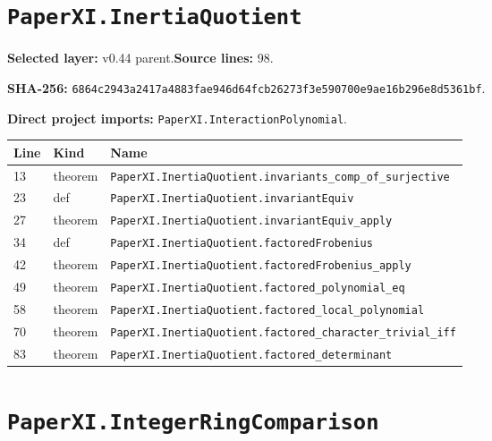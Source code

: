\documentclass[10pt,oneside]{book}
\begin{document}
\section{\texorpdfstring{\nolinkurl{PaperXI.InertiaQuotient}}{PaperXI.InertiaQuotient}}\label{module:PaperXI.InertiaQuotient}

\textbf{Selected layer:} v0.44 parent.\quad\textbf{Source lines:} 98.\par\textbf{SHA-256:} {\scriptsize\nolinkurl{6864c2943a2417a4883fae946d64fcb26273f3e590700e9ae16b296e8d5361bf}}.


\textbf{Direct project imports:} \nolinkurl{PaperXI.InteractionPolynomial}.

\begin{longtable}{@{}p{}p{}p{}@{}}\toprule Line&Kind&Name\\\midrule\endhead

13&theorem&\nolinkurl{PaperXI.InertiaQuotient.invariants_comp_of_surjective}\\

23&def&\nolinkurl{PaperXI.InertiaQuotient.invariantEquiv}\\

27&theorem&\nolinkurl{PaperXI.InertiaQuotient.invariantEquiv_apply}\\

34&def&\nolinkurl{PaperXI.InertiaQuotient.factoredFrobenius}\\

42&theorem&\nolinkurl{PaperXI.InertiaQuotient.factoredFrobenius_apply}\\

49&theorem&\nolinkurl{PaperXI.InertiaQuotient.factored_polynomial_eq}\\

58&theorem&\nolinkurl{PaperXI.InertiaQuotient.factored_local_polynomial}\\

70&theorem&\nolinkurl{PaperXI.InertiaQuotient.factored_character_trivial_iff}\\

83&theorem&\nolinkurl{PaperXI.InertiaQuotient.factored_determinant}\\

\bottomrule\end{longtable}

\section{\texorpdfstring{\nolinkurl{PaperXI.IntegerRingComparison}}{PaperXI.IntegerRingComparison}}\label{module:PaperXI.IntegerRingComparison}
\end{document}
